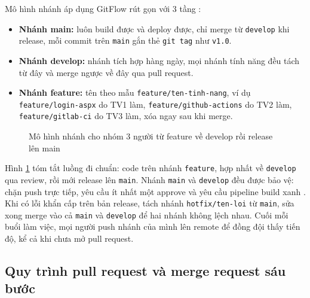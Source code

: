 Mô hình nhánh áp dụng GitFlow rút gọn với 3 tầng \cite{gitflow}:

\begin{itemize}
\item \textbf{Nhánh main:} luôn build được và deploy được, chỉ merge từ \texttt{develop} khi release, mỗi commit trên \texttt{main} gắn thẻ \verb|git tag| như \verb|v1.0|.
\item \textbf{Nhánh develop:} nhánh tích hợp hàng ngày, mọi nhánh tính năng đều tách từ đây và merge ngược về đây qua pull request.
\item \textbf{Nhánh feature:} tên theo mẫu \verb|feature/ten-tinh-nang|, ví dụ \verb|feature/login-aspx| do TV1 làm, \verb|feature/github-actions| do TV2 làm, \verb|feature/gitlab-ci| do TV3 làm, xóa ngay sau khi merge.
\end{itemize}

\begin{figure}[H]
\centering
{}
\caption{Mô hình nhánh cho nhóm 3 người từ feature về develop rồi release lên main}
\label{fig:c7-branch}
\end{figure}

Hình \ref{fig:c7-branch} tóm tắt luồng đi chuẩn: code trên nhánh \texttt{feature}, hợp nhất về \texttt{develop} qua review, rồi mới release lên \texttt{main}.
Nhánh \texttt{main} và \texttt{develop} đều được bảo vệ: chặn push trực tiếp, yêu cầu ít nhất một approve và yêu cầu pipeline build xanh \cite{githubdocs,gitlabdocs}.
Khi có lỗi khẩn cấp trên bản release, tách nhánh \verb|hotfix/ten-loi| từ \texttt{main}, sửa xong merge vào cả \texttt{main} và \texttt{develop} để hai nhánh không lệch nhau.
Cuối mỗi buổi làm việc, mọi người push nhánh của mình lên remote để đồng đội thấy tiến độ, kể cả khi chưa mở pull request.

\subsection{Quy trình pull request và merge request sáu bước}
\label{subsec:c7-prmr}

